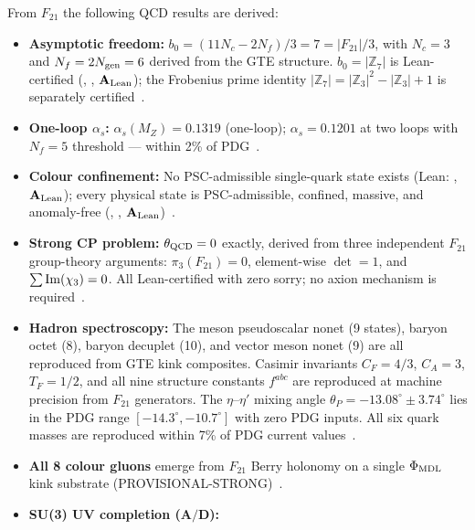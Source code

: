 From $F_{21}$ the following QCD results are derived:

\begin{itemize}[leftmargin=1.5em,itemsep=0.25em]
  \item \textbf{Asymptotic freedom:} $b_0 = (11N_c - 2N_f)/3 = 7 = |{F_{21}}|/3$,
    with $N_c = 3$ and $N_f = 2N_{\rm gen} = 6$ derived from the GTE structure.
    $b_0 = |\mathbb{Z}_7|$ is Lean-certified
    (, ,
    $\mathbf{A}_{\rm Lean}$); the Frobenius prime identity
    $|\mathbb{Z}_7| = |\mathbb{Z}_3|^2 - |\mathbb{Z}_3| + 1$ is separately
    certified~\cite{SpivackGTEQCDStructure}.
  \item \textbf{One-loop $\alpha_s$:} $\alpha_s(M_Z) = 0.1319$ (one-loop);
    $\alpha_s = 0.1201$ at two loops with $N_f{=}5$ threshold --- within 2\% of
    PDG~\cite{SpivackGTEQCDStructure}.
  \item \textbf{Colour confinement:} No PSC-admissible single-quark state exists
    (Lean: , $\mathbf{A}_{\rm Lean}$);
    every physical state is PSC-admissible, confined, massive, and anomaly-free
    (, ,
    $\mathbf{A}_{\rm Lean}$)~\cite{SpivackEmergentGravity}.
  \item \textbf{Strong CP problem:} $\theta_{\rm QCD} = 0$ exactly, derived from
    three independent $F_{21}$ group-theory arguments:
    $\pi_3(F_{21})=0$, element-wise $\det = 1$, and $\sum{\rm Im}(\chi_3)=0$.
    All Lean-certified with zero sorry; no axion mechanism is
    required~\cite{SpivackGTEQCDStructure}.
  \item \textbf{Hadron spectroscopy:} The meson pseudoscalar nonet (9 states),
    baryon octet (8), baryon decuplet (10), and vector meson nonet (9) are all
    reproduced from GTE kink composites.  Casimir invariants $C_F = 4/3$,
    $C_A = 3$, $T_F = 1/2$, and all nine structure constants $f^{abc}$ are
    reproduced at machine precision from $F_{21}$ generators.  The $\eta$--$\eta'$
    mixing angle $\theta_P = -13.08^\circ \pm 3.74^\circ$ lies in the PDG range
    $[-14.3^\circ, -10.7^\circ]$ with zero PDG inputs.  All six quark masses are
    reproduced within 7\% of PDG current values~\cite{SpivackGTEQCDStructure}.
  \item \textbf{All 8 colour gluons} emerge from $F_{21}$ Berry holonomy on a single
    $\Phi_{\rm MDL}$ kink substrate (PROVISIONAL-STRONG)~\cite{SpivackGTEUnification}.
  \item \textbf{SU(3) UV completion ($\mathbf{A/D}$):}

\end{itemize}
